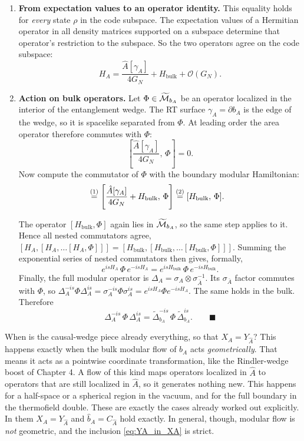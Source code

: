 \begin{keyresult}
\begin{enumerate}[leftmargin=*]
\item \textbf{From expectation values to an operator identity.}
This equality holds for \emph{every} state $\rho$ in the code subspace. The expectation values of a Hermitian
operator in all density matrices supported on a subspace determine that operator's restriction to the
subspace. So the two operators agree on the code subspace:
\[
H_A = \frac{\hat A[\gamma_A]}{4G_N} + H_{\text{bulk}} + \mathcal{O}(G_N) .
\]

\item \textbf{Action on bulk operators.}
Let $\Phi \in \widetilde{\mathcal{M}}_{b_A}$ be an operator localized in the interior of the entanglement wedge. The RT
surface $\gamma_A = \partial b_A$ is the edge of the wedge, so it is spacelike separated from $\Phi$. At
leading order the area operator therefore commutes with $\Phi$:
\[
\left[\frac{\hat A[\gamma_A]}{4G_N}, \, \Phi\right] = 0 .
\]
Now compute the commutator of $\Phi$ with the boundary modular Hamiltonian:
\begin{align}
[H_A, \, \Phi] &\eqstep{1} \left[\frac{\hat A[\gamma_A]}{4G_N} + H_{\text{bulk}}, \, \Phi\right]
\eqstep{2} [H_{\text{bulk}}, \, \Phi] . \notag
\end{align}
\quad
{}

The operator $[H_{\text{bulk}},\Phi]$ again lies in $\widetilde{\mathcal{M}}_{b_A}$, so the same step applies to it.
Hence all nested commutators agree, $[H_A,[H_A,\dots[H_A,\Phi]]]=[H_{\text{bulk}},[H_{\text{bulk}},\dots
[H_{\text{bulk}},\Phi]]]$. Summing the exponential series of nested commutators then gives, formally,
\[
e^{is H_A}\, \Phi\, e^{-is H_A} = e^{is H_{\text{bulk}}}\, \Phi\, e^{-is H_{\text{bulk}}} .
\]
Finally, the full modular operator is $\Delta_A=\sigma_A\otimes\sigma_{\bar A}^{-1}$. Its $\sigma_{\bar A}$
factor commutes with $\Phi$, so $\Delta_A^{-is}\Phi\Delta_A^{is}=\sigma_A^{-is}\Phi\sigma_A^{is}
=e^{isH_A}\Phi e^{-isH_A}$. The same holds in the bulk. Therefore
\[
\Delta_A^{-is}\,\Phi\,\Delta_A^{is} = \widetilde\Delta_{b_A}^{-is}\,\Phi\,\widetilde\Delta_{b_A}^{is} .
\qquad \blacksquare
\]
\end{enumerate}
\end{keyresult}

When is the causal-wedge piece already everything, so that $X_A=Y_{\widehat A}$? This happens exactly when the
bulk modular flow of $b_A$ acts \emph{geometrically}. That means it acts as a pointwise coordinate
transformation, like the Rindler-wedge boost of Chapter 4. A flow of this kind maps operators localized in
$\widehat A$ to operators that are still localized in $\widehat A$, so it generates nothing new. This happens
for a half-space or a spherical region in the vacuum, and for the full boundary in the thermofield double.
These are exactly the cases already worked out explicitly. In them $X_A=Y_{\widehat A}$ and
$\widehat b_A=C_{\widehat A}$ hold exactly. In general, though, modular flow is \emph{not} geometric, and the
inclusion \eqref{eq:YA_in_XA} is strict.

